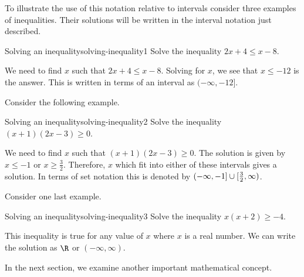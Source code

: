 To illustrate the use of this notation relative to intervals consider three
examples of inequalities. Their solutions will be written in the interval notation
just described.

\begin{example}{Solving an inequality}{solving-inequality1}
Solve the inequality $2x+4\leq x-8$.
\end{example}

\begin{solution}
We need to find $x$ such that $2x+4\leq x-8$. Solving for $x$, we see that 
$x\leq -12$ is the answer. This is written in terms of an interval as $(-\infty ,-12]$.
\end{solution}

Consider the following example.

\begin{example}{Solving an inequality}{solving-inequality2}
Solve the inequality $(x+1) (2x-3) \geq0$.
\end{example}

\begin{solution}
We need to find $x$ such that $(x+1) (2x-3) \geq0$. 
The solution is given by  $x\leq -1$ or $x\geq \frac{3}{2}$. Therefore, 
$x$ which fit into either of these intervals gives a solution. In terms of set notation this is denoted by $(-\infty ,-1]\cup
[ \vspace{0.05in}\frac{3}{2},\infty )$.
\end{solution}

Consider one last example.

\begin{example}{Solving an inequality}{solving-inequality3}
Solve the inequality $x (x+2) \geq-4$.
\end{example}

\begin{solution}
This inequality is true for any value of $x$ where $x$ is a real number. We can write the solution as $\R$ or $(
-\infty ,\infty)$.
\end{solution}

In the next section, we examine another important mathematical concept.
